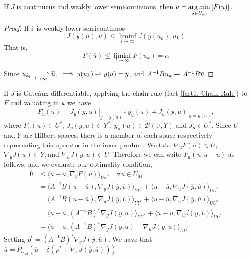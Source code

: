\begin{proposition}
	If $J$ is continuous and weakly lower semicontinuous, then 	$\overline{u}={\displaystyle {\underset {u\in U_{ad}}{\operatorname {arg\,min} }}\left[F(u)\right]}$.
	\begin{proof}
		If J is weakly lower semicontinuos 
			\[
				J(y(\overline{u}), \overline{u})\leq \liminf_{l\rightarrow \infty} J(y(u_k),u_k)
			\]
		That is, 
		\[
			F(\overline{u}) \leq \liminf_{l\rightarrow \infty} F(u_k) =\alpha 
		\]

	
	Since $u_{k_{l}} \xrightharpoonup[l\rightarrow \infty]{} \overline{u}$, $\implies y(u_k) \xrightharpoonup[]{} y(\overline{u})=\overline{y}$, and $A^{-1}B u_k \xrightharpoonup[]{}A^{-1}B  \overline{u}$
	\end{proof}
\end{proposition}
	If $J$ is Gate\^aux differentiable, applying the chain rule (fact \ref{fact1. Chain Rule}) to $F$ and valuating in $u$ we have
	\[
		F_u(u)=\left.J_y(y,u)\right|_{y=y(u)}\circ y_u(u)+\left.J_u(y,u)\right|_{y=y(u)},
	\]
	where $F_u(u) \in U^*$, $J_y(y,u) \in Y^*$, $y_u(u) \in \mathcal{B}(U, Y)$ and $J_u \in U^*$. Since $U$ and $Y$ are Hilbert spaces, there is a member of each space respectively representing this operator in the inner product. We take $\nabla_u F(u) \in U$,  $\nabla_y J(u) \in Y$, and $\nabla_u J(y, u) \in U$. Therefore we can write $F_u(u;u-\overline{u})$ as follows, and we evaluate our optimality condition,
	\begin{align*}
		0 &\leq \langle u-\overline{u}, \nabla_u F(\overline{u}) \rangle_{UU^*} \quad \forall u \in U_{ad}\\
		&= \langle A^{-1}B(u -\overline{u}), 
		\nabla_y J(\overline{y}, \overline{u}) \rangle_{YY^*}+\langle u-\overline{u},  \nabla_u J(\overline{y},\overline{u})\rangle_{UU^*} \\
		&= \langle A^{-1}B(u -\overline{u}), 
		\nabla_y J(\overline{y}, \overline{u}) \rangle_{YY^*}+\langle u-\overline{u},  \nabla_u J(\overline{y},\overline{u})\rangle_{UU^*} \\
		&= \langle u -\overline{u}, 
		(A^{-1}B)^\star\nabla_y J(y, \overline{u}) \rangle_{UU^*}+\langle u-\overline{u},  \nabla_u J(\overline{y},\overline{u})\rangle_{UU^*} \\
		&= \langle u -\overline{u}, 
		(A^{-1}B)^\star\nabla_y J(\overline{y}, \overline{u})+\nabla_u J(\overline{y},\overline{u})\rangle_{UU^*}
	\end{align*}
	Setting $p^*=(A^{-1}B)^\star\nabla_y J(\overline{y}, \overline{u})$. We have that $\overline{u}=P_{U_{ad}}(\overline{u}-\delta(p^*+\nabla_u J(\overline{y}, \overline{u})))$
